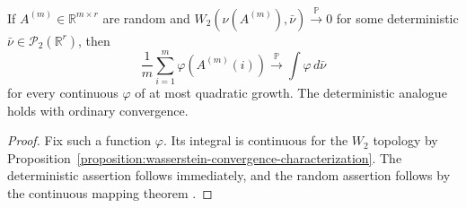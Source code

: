 \begin{corollary}
\label{corollary:wasserstein-empirical-observables}
If $A^{(m)}\in\mathbb R^{m\times r}$ are random and
$W_2(\nu(A^{(m)}),\bar\nu)\xrightarrow{\mathbb P}0$ for some
deterministic $\bar\nu\in\mathscr P_2(\mathbb R^r)$, then
\[
  \frac1m\sum_{i=1}^m\varphi(A^{(m)}(i))
  \xrightarrow{\mathbb P}\int\varphi\,d\bar\nu
\]
for every continuous $\varphi$ of at most quadratic growth.
The deterministic analogue holds with ordinary convergence.
\end{corollary}

\begin{proof}
Fix such a function $\varphi$.
Its integral is continuous for the $W_2$ topology by
Proposition~\ref{proposition:wasserstein-convergence-characterization}.
The deterministic assertion follows immediately, and the random
assertion follows by the continuous mapping theorem
\cite[Lemma~5.3]{kallenberg2021foundations}.
\end{proof}
